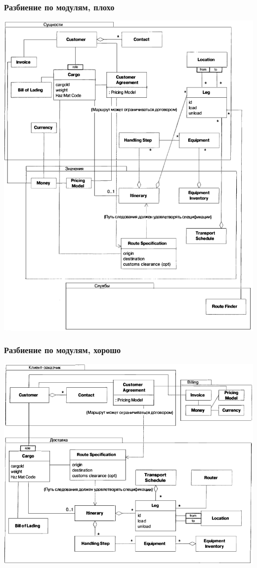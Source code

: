 \documentclass[xetex,mathserif,serif]{beamer}
\begin{document}
	\begin{frame}
		\frametitle{Разбиение по модулям, плохо}
		\begin{center}
			\includegraphics[height=0.9\textheight]{cargoModulesBad.png}
		\end{center}
	\end{frame}

	\begin{frame}
		\frametitle{Разбиение по модулям, хорошо}
		\begin{center}
			\includegraphics[height=0.8\textheight]{cargoModulesGood.png}
		\end{center}
	\end{frame}
\end{document}
